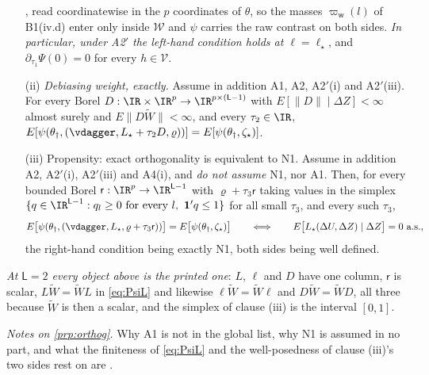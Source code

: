 \begin{proposition}
\begin{enumerate}
, read coordinatewise in the $p$ coordinates of $\theta$, so the masses
$\varpi_{\mathsf w}(l)$ of B1(iv.d) enter only inside $\mathcal W$ and
$\psi$ carries the raw contrast on both sides. \emph{In particular, under A2$'$ the left-hand condition
holds at $\ell=\ell_\star$}, and $\partial_{\tau_1}\Psi(0)=0$ for every $h\in\mathcal V$.
\item[(ii)] \emph{Debiasing weight, exactly.} Assume in addition A1, A2, A2$'$(i) and A2$'$(iii). For
every Borel $D:\IR\times\IR^{p}\to\IR^{p\times(\mathsf L-1)}$ with
$E[\|D\|\mid\Delta Z]<\infty$ almost surely and $E\|D\widetilde W\|<\infty$, and every $\tau_2\in\IR$,
$E[\psi(\theta_\dagger,(\vdagger,L_\star+\tau_2D,\varrho))]=E[\psi(\theta_\dagger,\zeta_\star)]$.
\item[(iii)] Propensity: exact orthogonality is equivalent to N1. Assume in addition A2,
A2$'$(i), A2$'$(iii) and A4(i), and
\emph{do not assume} N1, nor A1. Then, for every bounded Borel
$\mathsf r:\IR^{p}\to\IR^{\mathsf L-1}$
with $\varrho+\tau_3\mathsf r$ taking values
in the simplex $\{q\in\IR^{\mathsf L-1}:q_l\ge0\ \text{for every }l,\ \mathbf 1'q\le1\}$ for all small
$\tau_3$, and every such $\tau_3$,
\[
E\big[\psi(\theta_\dagger,(\vdagger,L_\star,\varrho+\tau_3\mathsf r))\big]=E\big[\psi(\theta_\dagger,\zeta_\star)\big]
\qquad\Longleftrightarrow\qquad
E\big[L_\star(\Delta U,\Delta Z)\mid\Delta Z\big]=0\ \text{a.s.},
\]
the right-hand condition being exactly N1, both sides being well defined.
\end{enumerate}
\emph{At $\mathsf L=2$ every object above is the printed one}: $L$, $\ell$ and $D$ have one column,
$\mathsf r$ is scalar, $L\widetilde W=\widetilde WL$ in \eqref{eq:PsiL} and likewise
$\ell\widetilde W=\widetilde W\ell$ and $D\widetilde W=\widetilde WD$, all three because $\widetilde W$
is then a scalar, and the simplex of clause \textup{(iii)} is the interval $[0,1]$.
\end{proposition}

\noindent\emph{Notes on \cref{prp:orthog}.} Why A1 is not in the global list, why N1 is assumed in no
part, and what the finiteness of \eqref{eq:PsiL} and the well-posedness of clause \textup{(iii)}'s two
sides rest on are .

